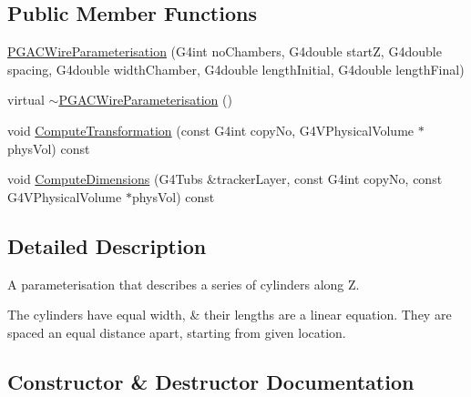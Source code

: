 \subsection*{Public Member Functions}
\begin{DoxyCompactItemize}
\item 
\hyperlink{classPGACWireParameterisation_a10d7eafe16d20cdc03db95db0e4fe153}{P\+G\+A\+C\+Wire\+Parameterisation} (G4int no\+Chambers, G4double startZ, G4double spacing, G4double width\+Chamber, G4double length\+Initial, G4double length\+Final)
\item 
virtual \hyperlink{classPGACWireParameterisation_adaaf2864ef9f0dcd8da35b7d00fd5294}{$\sim$\+P\+G\+A\+C\+Wire\+Parameterisation} ()
\item 
void \hyperlink{classPGACWireParameterisation_a5f44af81ac5b7be74e9ea2ca35e35d24}{Compute\+Transformation} (const G4int copy\+No, G4\+V\+Physical\+Volume $\ast$phys\+Vol) const 
\item 
void \hyperlink{classPGACWireParameterisation_acb47b7dcd2f4227f08d14195d37b6b6d}{Compute\+Dimensions} (G4\+Tubs \&tracker\+Layer, const G4int copy\+No, const G4\+V\+Physical\+Volume $\ast$phys\+Vol) const 
\end{DoxyCompactItemize}


\subsection{Detailed Description}
A parameterisation that describes a series of cylinders along Z.

The cylinders have equal width, \& their lengths are a linear equation. They are spaced an equal distance apart, starting from given location. 

\subsection{Constructor \& Destructor Documentation}
